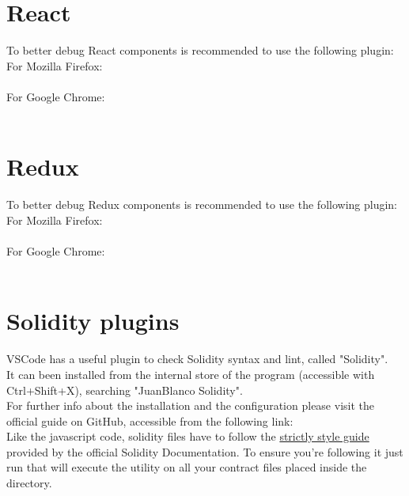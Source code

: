\documentclass[ManualeSviluppatore.tex]{subfiles}
\begin{document}
\section{React}
To better debug React components is recommended to use the following plugin: \\
For Mozilla Firefox: \\
 \\
For Google Chrome: \\
 \\

\section{Redux}
To better debug Redux components is recommended to use the following plugin: \\
For Mozilla Firefox: \\
 \\
For Google Chrome: \\
 \\

\section{Solidity plugins}
VSCode has a useful plugin to check Solidity syntax and lint, called "Solidity".\\
It can been installed from the internal store of the program (accessible with Ctrl+Shift+X), searching "JuanBlanco Solidity". \\
For further info about the installation and the configuration please visit the official guide on GitHub, accessible from the following link:
\\
Like the javascript code, solidity files have to follow the \href{https://solidity.readthedocs.io/en/v0.3.1/style-guide.html}{strictly style guide} provided by the official Solidity Documentation. To ensure you're following it just run  that will execute the  utility on all your contract files placed inside the  directory.
\end{document}
